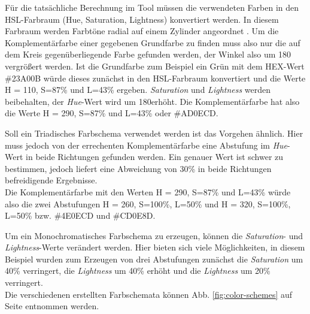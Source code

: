 Für die tatsächliche Berechnung im Tool müssen die verwendeten Farben in den HSL-Farbraum (Hue, Saturation, Lightness) konvertiert werden. In diesem Farbraum werden Farbtöne radial auf einem Zylinder angeordnet \cite{joblove1978color}.
Um die Komplementärfarbe einer gegebenen Grundfarbe zu finden muss also nur die auf dem Kreis gegenüberliegende Farbe gefunden werden, der Winkel also um 180 \degree vergrößert werden. 
Ist die Grundfarbe zum Beispiel ein Grün mit dem HEX-Wert \#23A00B würde dieses zunächst in den HSL-Farbraum konvertiert und die Werte H = 110\degree, S=87\% und L=43\% ergeben. \textit{Saturation} und \textit{Lightness} werden beibehalten, der \textit{Hue}-Wert wird um 180\degree erhöht. Die Komplementärfarbe hat also die Werte  H = 290\degree, S=87\% und L=43\% oder \#AD0ECD.

Soll ein Triadisches Farbschema verwendet werden ist das Vorgehen ähnlich. Hier muss jedoch von der errechenten Komplementärfarbe eine Abstufung im \textit{Hue}-Wert in beide Richtungen gefunden werden. Ein genauer Wert ist schwer zu bestimmen, jedoch liefert eine Abweichung von 30\% in beide Richtungen befreidigende Ergebnisse.\\
Die Komplementärfarbe mit den Werten  H = 290\degree, S=87\% und L=43\% würde also die zwei Abstufungen H = 260\degree, S=100\%, L=50\% und H = 320\degree, S=100\%, L=50\% bzw. \#4E0ECD und \#CD0E8D.

Um ein Monochromatisches Farbschema zu erzeugen, können die \textit{Saturation}- und \textit{Lightness}-Werte verändert werden. Hier bieten sich viele Möglichkeiten, in diesem Beispiel wurden zum Erzeugen von drei Abstufungen zunächst die \textit{Saturation} um 40\% verringert, die \textit{Lightness} um 40\% erhöht und die \textit{Lightness} um 20\% verringert.\\
Die verschiedenen erstellten Farbschemata können Abb. \ref{fig:color-schemes} auf Seite \pageref{fig:color-schemes} entnommen werden. 

